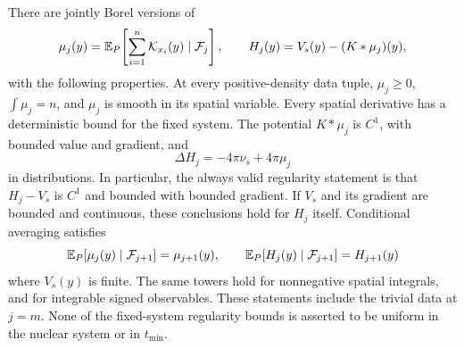 \begin{lemma}\label{lem:obs-data}
There are jointly Borel versions of
\[
 \mu_j(y)=\mathbb E_P\!\left[\sum_{i=1}^n\mathcal K_{x_i}(y)
                                      \mid\mathcal F_j\right],
 \qquad H_j(y)=V_s(y)-(K*\mu_j)(y),
\]
with the following properties. At every positive-density data tuple,
$\mu_j\ge0$, $\int\mu_j=n$, and $\mu_j$ is smooth in its spatial
variable. Every spatial derivative has a deterministic bound for
the fixed system. The potential $K*\mu_j$ is $C^1$, with bounded
value and gradient, and
\begin{equation}\label{eq:obs-poisson}
 \Delta H_j=-4\pi\nu_s+4\pi\mu_j
\end{equation}
in distributions. In particular, the always valid regularity
statement is that $H_j-V_s$ is $C^1$ and bounded with bounded
gradient. If $V_s$ and its gradient are bounded and continuous,
these conclusions hold for $H_j$ itself. Conditional averaging
satisfies
\begin{equation}\label{eq:obs-tower}
 \mathbb E_P[\mu_j(y)\mid\mathcal F_{j+1}]=\mu_{j+1}(y),\qquad
 \mathbb E_P[H_j(y)\mid\mathcal F_{j+1}]=H_{j+1}(y)
\end{equation}
where $V_s(y)$ is finite. The same towers hold for nonnegative
spatial integrals, and for integrable signed observables.
These statements include the trivial data at $j=m$. None of the
fixed-system regularity bounds is asserted to be uniform in the
nuclear system or in $t_{\min}$.
\end{lemma}

